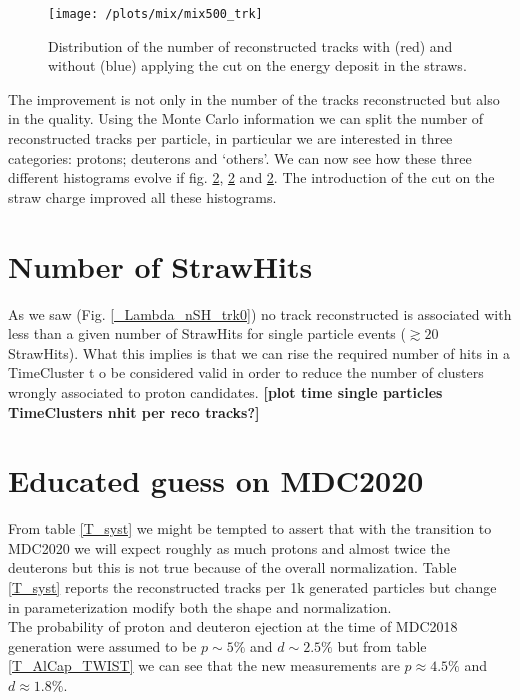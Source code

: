 \documentclass[12pt,a4paper,openright, oneside, titlepage]{book} %
\begin{document}
\begin{figure}[!htb]
\centering
\texttt{[image: /plots/mix/mix500\_trk]}
\caption[Number of tracks with and without the cut on the StrawHit energy]
{Distribution of the number of reconstructed tracks with (red) and without (blue) 
applying the cut on the energy deposit in the straws.}
\label{_mix_proton_trk}
\end{figure}

\noindent The improvement is not only in the number of the tracks reconstructed but also in the quality. 
Using the Monte Carlo information we can split the number of reconstructed tracks per particle, 
in particular we are interested in three categories: protons; deuterons and `others'.
We can now see how these three different histograms evolve if fig. \ref{}, \ref{} and \ref{}.
The introduction of the cut on the straw charge improved all these histograms.

\section{Number of StrawHits}
As we saw (Fig. \ref{_Lambda_nSH_trk0}) no track reconstructed is associated 
with less than a given number of StrawHits for single particle events ($\gtrsim 20$ StrawHits). 
What this implies is that we can rise the required number of hits in a TimeCluster t
o be considered valid in order to reduce the number of clusters wrongly associated to proton candidates.
\textbf{[plot time single particles TimeClusters nhit per reco tracks?]}

\section{Educated guess on MDC2020}
From table \ref{T_syst} we might be tempted to assert that with the transition to MDC2020 we will expect roughly as much protons and almost twice the deuterons but this is not true because of the overall normalization. 
Table \ref{T_syst} reports the reconstructed tracks per 1k generated particles but change in parameterization modify both the shape and normalization.\\
The probability of proton and deuteron ejection at the time of MDC2018 generation were assumed to be $p\sim5\%$ and $d\sim2.5\%$ but from table \ref{T_AlCap_TWIST} we can see that the new measurements are $p\approx4.5\%$ and $d\approx1.8\%$.
\end{document}
